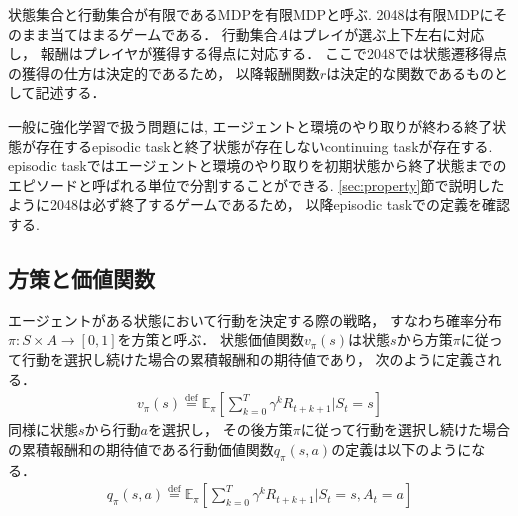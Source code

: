 状態集合と行動集合が有限であるMDPを有限MDPと呼ぶ.
2048は有限MDPにそのまま当てはまるゲームである．
行動集合\textit{A}はプレイが選ぶ上下左右に対応し， 報酬はプレイヤが獲得する得点に対応する．
ここで2048では状態遷移得点の獲得の仕方は決定的であるため， 以降報酬関数$r$は決定的な関数であるものとして記述する．

一般に強化学習で扱う問題には, エージェントと環境のやり取りが終わる終了状態が存在するepisodic taskと終了状態が存在しないcontinuing taskが存在する. 
episodic taskではエージェントと環境のやり取りを初期状態から終了状態までのエピソードと呼ばれる単位で分割することができる.
\ref{sec:property}節で説明したように2048は必ず終了するゲームであるため， 以降episodic taskでの定義を確認する. 

\subsection{方策と価値関数}
エージェントがある状態において行動を決定する際の戦略， すなわち確率分布$\pi:S \times A \rightarrow [0,1]$を方策と呼ぶ．
状態価値関数$v_{\pi}(s)$は状態$s$から方策$\pi$に従って行動を選択し続けた場合の累積報酬和の期待値であり， 次のように定義される．
\begin{align}
  v_{\pi}(s) \stackrel{\mathrm{def}}{=} \mathbb{E}_{\pi}\left[\sum_{k=0}^T \gamma^k R_{t+k+1}|S_t=s \right]
\end{align}
同様に状態$s$から行動$a$を選択し， その後方策$\pi$に従って行動を選択し続けた場合の累積報酬和の期待値である行動価値関数$q_{\pi}(s,a)$の定義は以下のようになる．
\begin{align}
  q_{\pi}(s,a) \stackrel{\mathrm{def}}{=} \mathbb{E}_{\pi}\left[\sum_{k=0}^T \gamma^k R_{t+k+1}|S_t=s, A_t=a \right]
\end{align}

